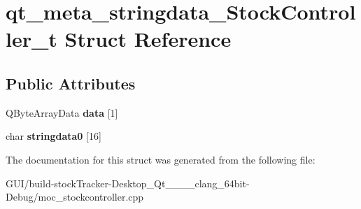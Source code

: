 \hypertarget{structqt__meta__stringdata___stock_controller__t}{}\section{qt\+\_\+meta\+\_\+stringdata\+\_\+\+Stock\+Controller\+\_\+t Struct Reference}
\label{structqt__meta__stringdata___stock_controller__t}
\subsection*{Public Attributes}
\begin{DoxyCompactItemize}
\item 
\mbox{\label{structqt__meta__stringdata___stock_controller__t_a8ed7da4404d59dfef0e90a7ea0f806d1}} 
Q\+Byte\+Array\+Data {\bfseries data} \mbox{[}1\mbox{]}
\item 
\mbox{\label{structqt__meta__stringdata___stock_controller__t_a6d69353ecbfa36d442b29cd3044f9e9c}} 
char {\bfseries stringdata0} \mbox{[}16\mbox{]}
\end{DoxyCompactItemize}


The documentation for this struct was generated from the following file\+:\begin{DoxyCompactItemize}
\item 
G\+U\+I/build-\/stock\+Tracker-\/\+Desktop\+\_\+\+Qt\+\_\+\_\+\_\+\_\+clang\+\_\+64bit-\/\+Debug/moc\+\_\+stockcontroller.\+cpp\end{DoxyCompactItemize}
